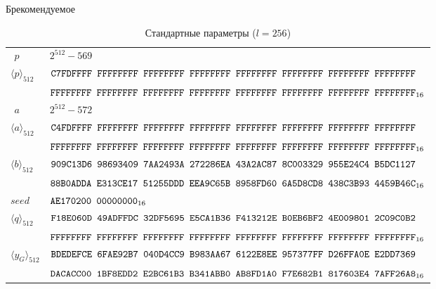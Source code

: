 \begin{appendix}{Б}{рекомендуемое}
\clearpage

\begin{table}[!h]
\caption{Стандартные параметры ($l=256$)}\label{Table.STD.StdCurve256}
{\small
\begin{tabular}{|l|l|}
\hline
$\phantom{\langle}p\phantom{\rangle}$ &
$2^{512}-569$\\
$\langle p\rangle_{512}$ & 
$\texttt{C7FDFFFF~FFFFFFFF~FFFFFFFF~FFFFFFFF~FFFFFFFF~FFFFFFFF~FFFFFFFF~FFFFFFFF}$\\
& 
$\texttt{FFFFFFFF~FFFFFFFF~FFFFFFFF~FFFFFFFF~FFFFFFFF~FFFFFFFF~FFFFFFFF~FFFFFFFF}_{16}$\\
%
\hline
$\phantom{\langle}a\phantom{\rangle}$ &
$2^{512}-572$\\
$\langle a\rangle_{512}$ & 
$\texttt{C4FDFFFF~FFFFFFFF~FFFFFFFF~FFFFFFFF~FFFFFFFF~FFFFFFFF~FFFFFFFF~FFFFFFFF}$\\
& 
$\texttt{FFFFFFFF~FFFFFFFF~FFFFFFFF~FFFFFFFF~FFFFFFFF~FFFFFFFF~FFFFFFFF~FFFFFFFF}_{16}$\\
%
\hline
$\langle b\rangle_{512}$ & 
$\texttt{909C13D6~98693409~7AA2493A~272286EA~43A2AC87~8C003329~955E24C4~B5DC1127}$\\
&
$\texttt{88B0ADDA~E313CE17~51255DDD~EEA9C65B~8958FD60~6A5D8CD8~438C3B93~4459B46C}_{16}$\\
%
\hline
$seed$ & 
$\texttt{AE170200~00000000}_{16}$\\
%
\hline
%
%
$\langle q\rangle_{512}$ & 
$\texttt{F18E060D~49ADFFDC~32DF5695~E5CA1B36~F413212E~B0EB6BF2~4E009801~2C09C0B2}$\\
&
$\texttt{FFFFFFFF~FFFFFFFF~FFFFFFFF~FFFFFFFF~FFFFFFFF~FFFFFFFF~FFFFFFFF~FFFFFFFF}_{16}$\\
%
\hline
$\langle y_G\rangle_{512}$ & 
$\texttt{BDEDEFCE~6FAE92B7~040D4CC9~B983AA67~6122E8EE~957377FF~D26FFA0E~E2DD7369}$\\
&
$\texttt{DACACC00~1BF8EDD2~E2BC61B3~B341ABB0~AB8FD1A0~F7E682B1~817603E4~7AFF26A8}_{16}$\\
\hline
\end{tabular}
}
\end{table}

%
%
%

\mbox{}
\vfill
\mbox{}
\clearpage

\end{appendix}
